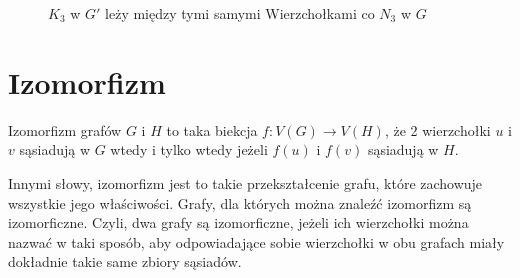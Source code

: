     \begin{figure}[H]
      \centering
        \hspace{15mm}
        \caption{ $K_3$ w $G'$ leży między tymi samymi Wierzchołkami co $N_3$ w $G$ }
        \label{dopwiesz}
     \end{figure}




  \section{Izomorfizm}

  \begin{definition}
    Izomorfizm grafów $G$ i $H$ to taka biekcja $f:V(G) \to V(H)$, że 2 wierzchołki $u$ i $v$ sąsiadują w $G$ wtedy i tylko wtedy jeżeli $f(u)$ i $f(v)$ sąsiadują w $H$.
  \end{definition}

  Innymi słowy, izomorfizm jest to takie przekształcenie grafu, które zachowuje wszystkie jego właściwości. Grafy, dla których można znaleźć izomorfizm są izomorficzne. Czyli, dwa grafy są izomorficzne, jeżeli ich wierzchołki można nazwać w taki sposób, 
  aby odpowiadające sobie wierzchołki w obu grafach miały dokładnie takie same zbiory sąsiadów.
  

